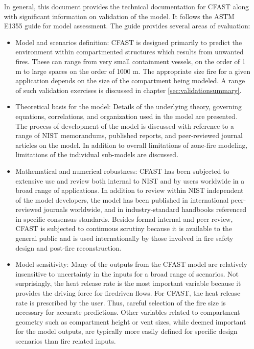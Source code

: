 \documentclass[12pt]{book}
\begin{document}
In general, this document provides the technical documentation for CFAST along with
significant information on validation of the model. It follows the ASTM E1355 guide for model
assessment. The guide provides several areas of evaluation:

\begin{itemize}
\item Model and scenarios definition: CFAST is designed primarily to predict the
environment within compartmented structures which results from unwanted fires. These
can range from very small containment vessels, on the order of 1 m to large spaces on
the order of 1000 m. The appropriate size fire for a given application depends on the size
of the compartment being modeled. A range of such validation exercises is discussed in
chapter \ref{sec:validationsummary}.

\item Theoretical basis for the model: Details of the underlying theory, governing equations,
correlations, and organization used in the model are presented. The process of
development of the model is discussed with reference to a range of NIST memorandums,
published reports, and peer-reviewed journal articles on the model. In addition to overall
limitations of zone-fire modeling, limitations of the individual sub-models are discussed.

\item Mathematical and numerical robustness: CFAST has been subjected to extensive use
and review both internal to NIST and by users worldwide in a broad range of
applications. In addition to review within NIST independent of the model developers, the
model has been published in international peer-reviewed journals worldwide, and in
industry-standard handbooks referenced in specific consensus standards. Besides formal
internal and peer review, CFAST is subjected to continuous scrutiny because it is
available to the general public and is used internationally by those involved in fire safety
design and post-fire reconstruction.

\item Model sensitivity: Many of the outputs from the CFAST model are relatively insensitive
to uncertainty in the inputs for a broad range of scenarios. Not surprisingly, the heat
release rate is the most important variable because it provides the driving force for firedriven
flows. For CFAST, the heat release rate is prescribed by the user. Thus, careful
selection of the fire size is necessary for accurate predictions. Other variables related to
compartment geometry such as compartment height or vent sizes, while deemed
important for the model outputs, are typically more easily defined for specific design
scenarios than fire related inputs.


\end{itemize}
\end{document}
